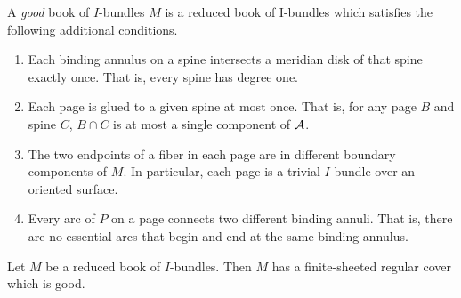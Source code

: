 \begin{defn}

A \emph{good} book of $I$-bundles $M$ is a reduced book of I-bundles which
satisfies the following additional conditions.

\begin{enumerate}

\item Each binding annulus on a spine intersects a meridian disk of that spine
exactly once. That is, every spine has degree one.

\item Each page is glued to a given spine at most once. That is, for any page
$B$ and spine $C$, $B \cap C$ is at most a single component of $\mathcal{A}$.

\item The two endpoints of a fiber in each page are in different boundary
components of $M$. In particular, each page is a trivial $I$-bundle over an
oriented surface.

\item Every arc of $P$ on a page connects two different binding annuli. That
is, there are no essential arcs that begin and end at the same binding annulus.

\end{enumerate}

\end{defn}

\begin{thm}

Let $M$ be a reduced book of $I$-bundles. Then $M$ has a finite-sheeted regular
cover which is good.

\end{thm}

